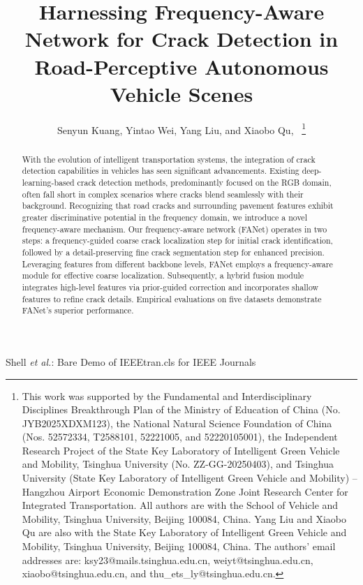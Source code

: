 \documentclass[journal]{IEEEtran}
\begin{document}
\title{Harnessing Frequency-Aware Network for Crack Detection in Road-Perceptive Autonomous Vehicle Scenes}


\author{Senyun Kuang, Yintao Wei, Yang Liu, and Xiaobo Qu,~%
\thanks{This work was supported by the Fundamental and Interdisciplinary Disciplines Breakthrough Plan of the Ministry of Education of China (No. JYB2025XDXM123), the National Natural Science Foundation of China (Nos. 52572334, T2588101, 52221005, and 52220105001), the Independent Research Project of the State Key Laboratory of Intelligent Green Vehicle and Mobility, Tsinghua University (No. ZZ-GG-20250403), and Tsinghua University (State Key Laboratory of Intelligent Green Vehicle and Mobility) -- Hangzhou Airport Economic Demonstration Zone Joint Research Center for Integrated Transportation. All authors are with the School of Vehicle and Mobility, Tsinghua University, Beijing 100084, China. Yang Liu and Xiaobo Qu are also with the State Key Laboratory of Intelligent Green Vehicle and Mobility, Tsinghua University, Beijing 100084, China. The authors' email addresses are: ksy23@mails.tsinghua.edu.cn, weiyt@tsinghua.edu.cn, xiaobo@tsinghua.edu.cn, and thu\_ets\_ly@tsinghua.edu.cn.}}

%
{Shell \MakeLowercase{\textit{et al.}}: Bare Demo of IEEEtran.cls for IEEE Journals}

\maketitle


\begin{abstract}
With the evolution of intelligent transportation systems, the integration of crack detection capabilities in vehicles has seen significant advancements. Existing deep-learning-based crack detection methods, predominantly focused on the RGB domain, often fall short in complex scenarios where cracks blend seamlessly with their background. Recognizing that road cracks and surrounding pavement features exhibit greater discriminative potential in the frequency domain, we introduce a novel frequency-aware mechanism. Our frequency-aware network (FANet) operates in two steps: a frequency-guided coarse crack localization step for initial crack identification, followed by a detail-preserving fine crack segmentation step for enhanced precision. Leveraging features from different backbone levels, FANet employs a frequency-aware module for effective coarse localization. Subsequently, a hybrid fusion module integrates high-level features via prior-guided correction and incorporates shallow features to refine crack details. Empirical evaluations on five datasets demonstrate FANet's superior performance.
\end{abstract}
\end{document}
